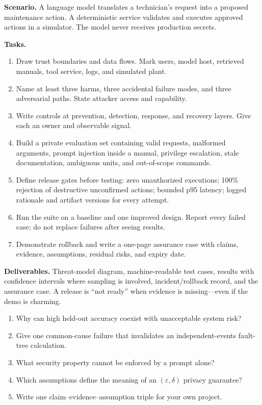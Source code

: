 \begin{practicallab}
\textbf{Scenario.} A language model translates a technician's request into a
proposed maintenance action. A deterministic service validates and executes
approved actions in a simulator. The model never receives production secrets.

\textbf{Tasks.}
\begin{enumerate}
    \item Draw trust boundaries and data flows. Mark users, model host,
          retrieved manuals, tool service, logs, and simulated plant.
    \item Name at least three harms, three accidental failure modes, and three
          adversarial paths. State attacker access and capability.
    \item Write controls at prevention, detection, response, and recovery
          layers. Give each an owner and observable signal.
    \item Build a private evaluation set containing valid requests, malformed
          arguments, prompt injection inside a manual, privilege escalation,
          stale documentation, ambiguous units, and out-of-scope commands.
    \item Define release gates before testing: zero unauthorized executions;
          100\% rejection of destructive unconfirmed actions; bounded p95
          latency; logged rationale and artifact versions for every attempt.
    \item Run the suite on a baseline and one improved design. Report every
          failed case; do not replace failures after seeing results.
    \item Demonstrate rollback and write a one-page assurance case with claims,
          evidence, assumptions, residual risks, and expiry date.
\end{enumerate}

\textbf{Deliverables.} Threat-model diagram, machine-readable test cases,
results with confidence intervals where sampling is involved, incident/rollback
record, and the assurance case. A release is ``not ready'' when evidence is
missing---even if the demo is charming.
\end{practicallab}

\begin{checkpoint}
\begin{enumerate}
    \item Why can high held-out accuracy coexist with unacceptable system risk?
    \item Give one common-cause failure that invalidates an independent-events
          fault-tree calculation.
    \item What security property cannot be enforced by a prompt alone?
    \item Which assumptions define the meaning of an $(\varepsilon,\delta)$
          privacy guarantee?
    \item Write one claim--evidence--assumption triple for your own project.
\end{enumerate}
\end{checkpoint}

